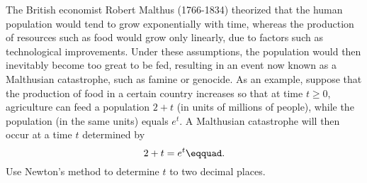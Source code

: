 The British economist Robert Malthus (1766-1834)
theorized that the human population would tend to grow
exponentially with time, whereas the production of resources
such as food would grow only linearly, due to factors such as technological improvements.
Under these assumptions, the
population would then inevitably become too great to be fed,
resulting in an event now known as a Malthusian catastrophe, such as famine or
genocide. As an example, suppose that the production of food
in a certain country increases so that at time $t\ge0$, agriculture
can feed a population $2+t$ (in units of millions of
people), while the population (in the same units) equals $e^t$.
A Malthusian catastrophe will then occur at a time $t$ determined by
\begin{equation*}
  2+t = e^t\eqquad.
\end{equation*}
Use Newton's method to determine $t$ to two decimal places.
\answercheck
